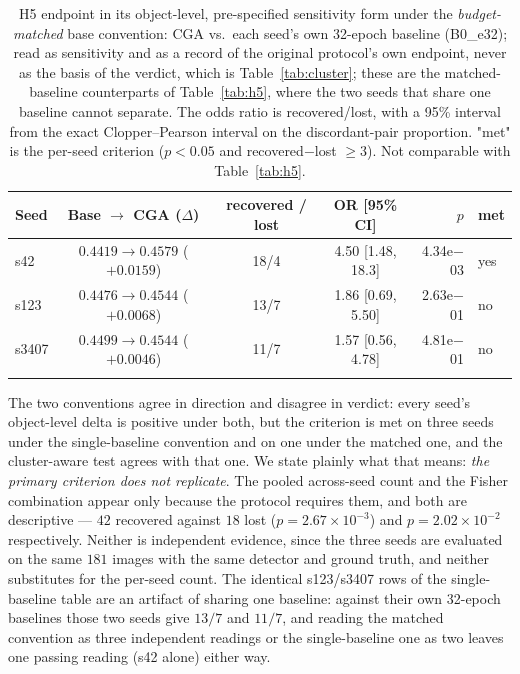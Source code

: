 \documentclass[pdflatex,sn-mathphys-num]{sn-jnl}
\theoremstyle{thmstyleone}%
\theoremstyle{thmstyletwo}%
\theoremstyle{thmstylethree}%
\begin{document}
\begin{table}[t]
\caption{H5 endpoint in its object-level, pre-specified sensitivity form under the \emph{budget-matched} base convention: CGA vs.\ each seed's own 32-epoch baseline (B0\_e32); read as sensitivity and as a record of the original protocol's own endpoint, never as the basis of the verdict, which is Table~\ref{tab:cluster}; these are the matched-baseline counterparts of Table~\ref{tab:h5}, where the two seeds that share one baseline cannot separate. The odds ratio is recovered/lost, with a 95\% interval from the exact Clopper--Pearson interval on the discordant-pair proportion. "met" is the per-seed criterion ($p<0.05$ and recovered$-$lost $\geq 3$). Not comparable with Table~\ref{tab:h5}.}
\label{tab:h5e32}%
\small
\begin{tabular}{@{}lcccrl@{}}
\toprule
Seed & Base $\to$ CGA ($\Delta$) & recovered / lost & OR [95\% CI] & $p$ & met \\
\midrule
s42 & $0.4419\to0.4579$ ($+0.0159$) & 18/4 & 4.50 [1.48, 18.3] & 4.34e$-$03 & yes \\
s123 & $0.4476\to0.4544$ ($+0.0068$) & 13/7 & 1.86 [0.69, 5.50] & 2.63e$-$01 & no \\
s3407 & $0.4499\to0.4544$ ($+0.0046$) & 11/7 & 1.57 [0.56, 4.78] & 4.81e$-$01 & no \\
\botrule
\end{tabular}
\end{table}

The two conventions agree in direction and disagree in verdict: every seed's object-level delta is positive under both, but the criterion is met on three seeds under the single-baseline convention and on one under the matched one, and the cluster-aware test agrees with that one. We state plainly what that means: \emph{the primary criterion does not replicate}. The pooled across-seed count and the Fisher combination appear only because the protocol requires them, and both are descriptive --- $42$ recovered against $18$ lost ($p = 2.67\times10^{-3}$) and $p = 2.02\times10^{-2}$ respectively. Neither is independent evidence, since the three seeds are evaluated on the same $181$ images with the same detector and ground truth, and neither substitutes for the per-seed count. The identical s123/s3407 rows of the single-baseline table are an artifact of sharing one baseline: against their own 32-epoch baselines those two seeds give $13/7$ and $11/7$, and reading the matched convention as three independent readings or the single-baseline one as two leaves one passing reading (s42 alone) either way.
\end{document}
